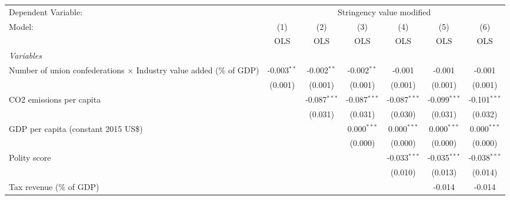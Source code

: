 
\begingroup
\centering
\begin{tabular}{lcccccc}
   \toprule
   Dependent Variable: & \multicolumn{6}{c}{Stringency value modified}\\
   Model:                                                                     & (1)           & (2)            & (3)            & (4)            & (5)            & (6)\\  
                                                                              &  OLS          & OLS            & OLS            & OLS            & OLS            & OLS\\  
   \midrule
   \emph{Variables}\\
   Number of union confederations $\times$ Industry value added (\% of GDP)   & -0.003$^{**}$ & -0.002$^{**}$  & -0.002$^{**}$  & -0.001         & -0.001         & -0.001\\   
                                                                              & (0.001)       & (0.001)        & (0.001)        & (0.001)        & (0.001)        & (0.001)\\   
   CO2 emissions per capita                                                   &               & -0.087$^{***}$ & -0.087$^{***}$ & -0.087$^{***}$ & -0.099$^{***}$ & -0.101$^{***}$\\   
                                                                              &               & (0.031)        & (0.031)        & (0.030)        & (0.031)        & (0.032)\\   
   GDP per capita (constant 2015 US\$)                                        &               &                & 0.000$^{***}$  & 0.000$^{***}$  & 0.000$^{***}$  & 0.000$^{***}$\\   
                                                                              &               &                & (0.000)        & (0.000)        & (0.000)        & (0.000)\\   
   Polity score                                                               &               &                &                & -0.033$^{***}$ & -0.035$^{***}$ & -0.038$^{***}$\\   
                                                                              &               &                &                & (0.010)        & (0.013)        & (0.014)\\   
   Tax revenue (\% of GDP)                                                    &               &                &                &                & -0.014         & -0.014\\   

\end{tabular}
